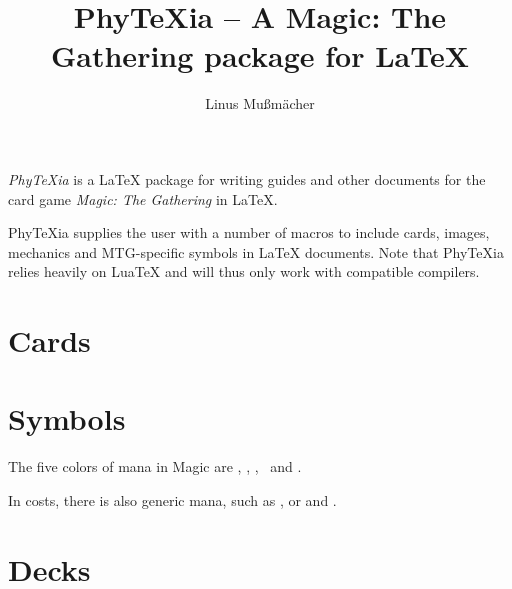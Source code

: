 \documentclass[a4paper]{scrartcl}
\title{PhyTeXia -- A Magic: The Gathering package for \LaTeX}
\author{Linus Mußmächer}
\begin{document}
	\maketitle

	\emph{PhyTeXia} is a \LaTeX{} package for writing guides and other documents for the card game \emph{Magic: The Gathering} in \LaTeX{}.

	PhyTeXia supplies the user with a number of macros to include cards, images, mechanics and MTG-specific symbols in \LaTeX{} documents.
	Note that PhyTeXia relies heavily on LuaTeX and will thus only work with compatible compilers.

	\section{Cards}

	\section{Symbols}
	The five colors of mana in Magic are \mtgwhite, \mtgblue, \mtgblack, \mtgred\ and \mtggreen .

	In costs, there is also generic mana, such as ,  or  and .

	\section{Decks}
\end{document}
